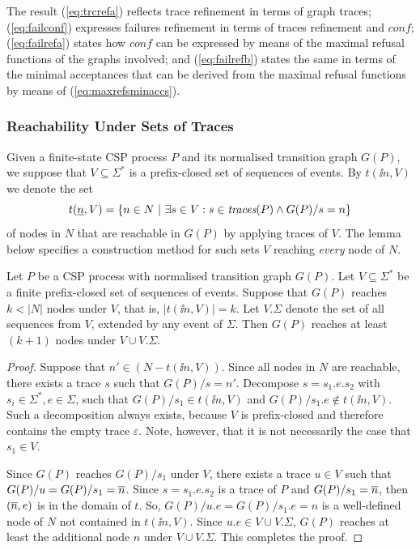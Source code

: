 %
The result (\ref{eq:trcrefa}) reflects trace refinement in terms of graph
traces; (\ref{eq:failconf}) expresses failures refinement in terms of traces
refinement and $conf$; (\ref{eq:failrefa}) states how $conf$ can be expressed
by means of the maximal refusal functions of the graphs involved; and
(\ref{eq:failrefb}) states the same in terms of the minimal acceptances that
can be derived from the maximal refusal functions by means of
(\ref{eq:maxrefsminaccs}). 

\subsubsection*{Reachability Under Sets of Traces}
\label{sec:V} Given a finite-state CSP process $P$ and its normalised
transition graph $G(P)$,
we suppose that $V\subseteq\Sigma^*$ is a prefix-closed set  of sequences of
events. By $t(\ii n,V)$ we denote the set
\[
t(\underline{n},V) = \{ n\in N~|~\exists s\in V: s\in\text{\it traces}(P)\wedge G(P)/s = n \}
\]
of nodes in $N$ that are reachable in $G(P)$ by applying traces of $V$. The
lemma below specifies a construction method for such sets $V$ reaching {\it
every} node of $N$.

\begin{lemma}
\label{lemma:extendV} Let $P$ be a CSP process with normalised transition
graph $G(P)$. %
Let
$V\subseteq\Sigma^*$ be a finite prefix-closed set of sequences of events.
Suppose that  $G(P)$ reaches $k < |N|$ nodes under $V$, that is, $|t(\ii
n,V)| = k$. Let $V.\Sigma$ denote the set of all sequences from $V$, extended
by any event of $\Sigma$. Then $G(P)$ reaches at least $(k+1)$ nodes under
$V\cup V.\Sigma$.
\end{lemma}
\begin{proof}
Suppose that $n'\in (N - t(\ii n,V))$.  Since all nodes in $N$ are reachable,
there exists a trace $s$ such that $G(P)/s = n'$. Decompose $s = s_1.e.s_2$
with $s_i\in\Sigma^*, e\in\Sigma$, such that $G(P)/s_1 \in t(\ii n,V)$ and
$G(P)/s_1.e \not\in t(\ii n,V)$. Such a decomposition always exists, because
$V$ is prefix-closed and therefore contains the empty trace $\varepsilon$.
Note, however, that it is not necessarily the case that $s_1\in V$.

Since $G(P)$ reaches $G(P)/s_1$ under $V$, there exists a trace $u\in V$ such
that $G(P)/u = G(P)/s_1 = \overline n$. Since $s = s_1.e.s_2$ is a trace of $P$ and
$G(P)/s_1 = \overline n$, then $(\overline n,e)$ is in the domain of $t$. So, $ G(P)/u.e
= G(P)/s_1.e = n$ is a well-defined node of $N$ not contained in $t(\ii
n,V)$. Since $u.e\in V\cup V.\Sigma$, $G(P)$ reaches at least the additional
node $n$ under $V\cup V.\Sigma$. This completes the proof. \xbox
\end{proof}

